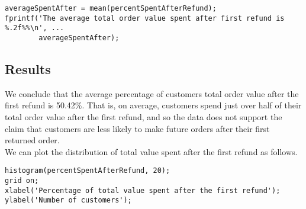 \begin{lstlisting}
averageSpentAfter = mean(percentSpentAfterRefund);
fprintf('The average total order value spent after first refund is %.2f%%\n', ...
        averageSpentAfter);
\end{lstlisting}

\newpage
\subsection{Results}

We conclude that the average percentage of customers total order value after the first refund is 50.42\%. That is, on average, customers spend just over half of their total order value after the first refund, and so the data does not support the claim that customers are less likely to make future orders after their first returned order. \\

\noindent
We can plot the distribution of total value spent after the first refund as follows.
\begin{lstlisting}
histogram(percentSpentAfterRefund, 20);
grid on;
xlabel('Percentage of total value spent after the first refund');
ylabel('Number of customers');
\end{lstlisting}


